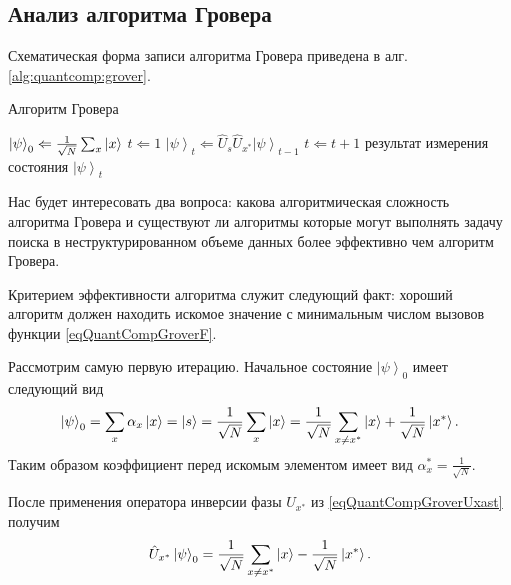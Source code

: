 \subsection{Анализ алгоритма Гровера}

Схематическая форма записи алгоритма Гровера приведена в алг.
\ref{alg:quantcomp:grover}.  
\begin{algorithm}
\caption{Алгоритм Гровера}
\label{alg:quantcomp:grover}
\begin{algorithmic}
    \STATE $\left|\psi\right>_0 \Leftarrow \frac{1}{\sqrt{N}}\sum_x 
    \ket{x}$
    \STATE $t \Leftarrow 1$
    \REPEAT
    \STATE $\left|\psi\right>_t \Leftarrow \hat{U}_s\hat{U}_{x^{\ast}}
    \left|\psi\right>_{t-1}$
    \STATE $t \Leftarrow t + 1$
    \RETURN результат измерения состояния $\left|\psi\right>_t$
\end{algorithmic}
\end{algorithm}

Нас будет интересовать два вопроса: какова алгоритмическая сложность
алгоритма Гровера и существуют ли алгоритмы которые могут выполнять
задачу поиска в неструктурированном объеме данных более эффективно чем
алгоритм Гровера.

Критерием эффективности алгоритма служит следующий факт: хороший
алгоритм должен находить искомое значение с минимальным числом вызовов
функции \eqref{eqQuantCompGroverF}.

Рассмотрим самую первую итерацию. Начальное состояние
$\left|\psi\right>_0$ имеет следующий вид
\begin{equation}
\left|\psi\right>_0 =
\sum_x \alpha_x \ket{x} =  
\ket{s} = 
\frac{1}{\sqrt{N}}\sum_x \ket{x} = 
\frac{1}{\sqrt{N}}\sum_{x\ne x^{\ast}} \ket{x} +
\frac{1}{\sqrt{N}} \left|x^{\ast}\right>.
\nonumber
\end{equation}
Таким образом коэффициент перед искомым элементом имеет вид
$\alpha_x^{\ast} = \frac{1}{\sqrt{N}}$. 

После применения оператора инверсии
фазы $U_{x^{\ast}}$ из \eqref{eqQuantCompGroverUxast} получим
\begin{equation}
\hat{U}_{x^{\ast}} \left|\psi\right>_0 =
\frac{1}{\sqrt{N}}\sum_{x\ne x^{\ast}} \ket{x} - 
\frac{1}{\sqrt{N}} \left|x^{\ast}\right>.
\nonumber
\end{equation}


